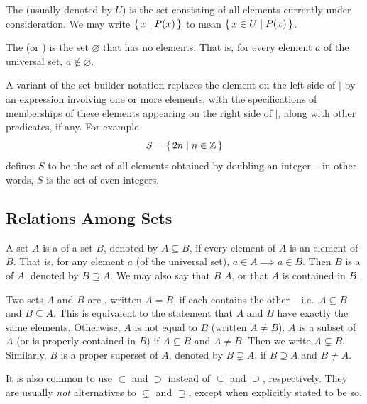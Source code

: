 The  (usually denoted by $U$) is the set consisting of all elements currently under consideration. We may write $\qty{\, x \mid P(x) \,}$ to mean $\qty{\, x \in U \mid P(x) \,}$.

The  (or ) is the set $\varnothing$ that has no elements. That is, for every element $a$ of the universal set, $a \notin \varnothing$.

\begin{Note*}
A variant of the set-builder notation replaces the element on the left side of $\mid$ by an expression involving one or more elements, with the specifications of memberships of these elements appearing on the right side of $\mid$, along with other predicates, if any. For example
\begin{equation*}
S = \qty{\, 2n \mid n \in \mathbb Z \,}
\end{equation*}
defines $S$ to be the set of all elements obtained by doubling an integer -- in other words, $S$ is the set of even integers.
\end{Note*}

\subsection{Relations Among Sets}\label{subsec:SetRels}

A set $A$ is a  of a set $B$, denoted by $A \subseteq B$, if every element of $A$ is an element of $B$. That is, for any element $a$ (of the universal set), $a \in A \implies a \in B$. Then $B$ is a  of $A$, denoted by $B \supseteq A$. We may also say that $B$  $A$, or that $A$ is contained in $B$.

Two sets $A$ and $B$ are , written $A = B$, if each contains the other -- i.e.\ $A \subseteq B$ and $B \subseteq A$. This is equivalent to the statement that $A$ and $B$ have exactly the same elements. Otherwise, $A$ is not equal to $B$ (written $A \ne B$). $A$ is a  subset of $A$ (or is properly contained in $B$) if $A \subseteq B$ and $A \ne B$. Then we write $A \subsetneq B$. Similarly, $B$ is a proper superset of $A$, denoted by $B \supsetneq A$, if $B \supseteq A$ and $B \ne A$.

\begin{Note*}
It is also common to use $\subset$ and $\supset$ instead of $\subseteq$ and $\supseteq$, respectively. They are usually \emph{not} alternatives to $\subsetneq$ and $\supsetneq$, except when explicitly stated to be so.
\end{Note*}

